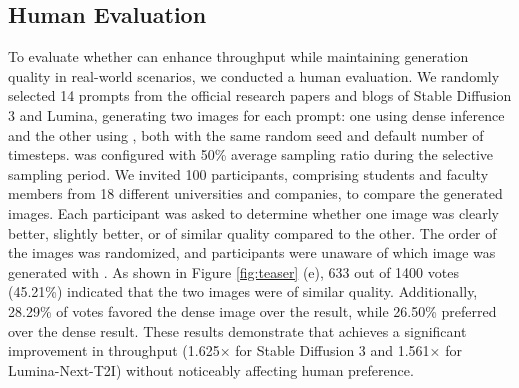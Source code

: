 \subsection{Human Evaluation}
To evaluate whether \ourmethod{} can enhance throughput while maintaining generation quality in real-world scenarios, we conducted a human evaluation. We randomly selected 14 prompts from the official research papers and blogs of Stable Diffusion 3 and Lumina, generating two images for each prompt: one using dense inference and the other using \ourmethod{}, both with the same random seed and default number of timesteps. \ourmethod{} was configured with 50\% average sampling ratio during the selective sampling period. We invited 100 participants, comprising students and faculty members from 18 different universities and companies, to compare the generated images. Each participant was asked to determine whether one image was clearly better, slightly better, or of similar quality compared to the other. The order of the images was randomized, and participants were unaware of which image was generated with \ourmethod{}. As shown in Figure \ref{fig:teaser} (e), 633 out of 1400 votes (45.21\%) indicated that the two images were of similar quality. Additionally, 28.29\% of votes favored the dense image over the \ourmethod{} result, while 26.50\% preferred \ourmethod{} over the dense result. These results demonstrate that \ourmethod{} achieves a significant improvement in throughput (1.625× for Stable Diffusion 3 and 1.561× for Lumina-Next-T2I) without noticeably affecting human preference.





